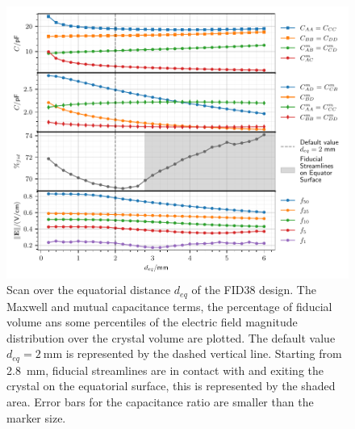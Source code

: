 \begin{figure}
\centering
\includegraphics[scale=1]{Figures/ElectrodesScan/capacitance_fiducial_equatorial_distance.pdf}
\caption{Scan over the equatorial distance $d_{eq}$ of the FID38 design. The Maxwell and mutual capacitance terms, the percentage of fiducial volume ans some percentiles of the electric field magnitude distribution over the crystal volume are plotted. The default value $d_{eq}=\SI{2}{\mm}$ is represented by the dashed vertical line. Starting from \SI{2.8}{\mm}, fiducial streamlines are in contact with and exiting the crystal on the equatorial surface, this is represented by the shaded area. Error bars for the capacitance ratio are smaller than the marker size.}
\label{fig:capacitance-fiducial-equatorial-distance}
\end{figure}

